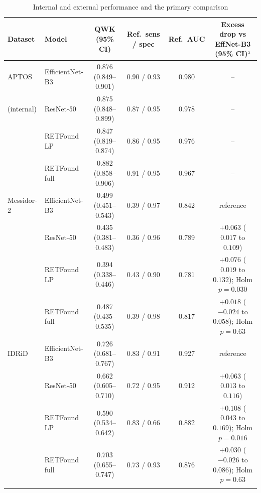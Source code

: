 \documentclass[pdflatex,sn-basic,Numbered]{sn-jnl}
\begin{document}
\begin{table}
\caption{Internal and external performance and the primary comparison}\label{tab:perf}
\footnotesize
\begin{tabular*}{\textheight}{@{\extracolsep\fill}llcccc}
\toprule
Dataset & Model & QWK (95\% CI) & Ref.\ sens / spec & Ref.\ AUC & Excess drop vs EffNet-B3 (95\% CI)$^{\mathrm{a}}$ \\
\midrule
APTOS & EfficientNet-B3 & 0.876 (0.849--0.901) & 0.90 / 0.93 & 0.980 & -- \\
(internal) & ResNet-50 & 0.875 (0.848--0.899) & 0.87 / 0.95 & 0.978 & -- \\
 & RETFound LP & 0.847 (0.819--0.874) & 0.86 / 0.95 & 0.976 & -- \\
 & RETFound full & 0.882 (0.858--0.906) & 0.91 / 0.95 & 0.967 & -- \\
\midrule
Messidor-2 & EfficientNet-B3 & 0.499 (0.451--0.543) & 0.39 / 0.97 & 0.842 & reference \\
 & ResNet-50 & 0.435 (0.381--0.483) & 0.36 / 0.96 & 0.789 & $+0.063$ ($0.017$ to $0.109$) \\
 & RETFound LP & 0.394 (0.338--0.446) & 0.43 / 0.90 & 0.781 & $+0.076$ ($0.019$ to $0.132$); Holm $p=0.030$ \\
 & RETFound full & 0.487 (0.435--0.535) & 0.39 / 0.98 & 0.817 & $+0.018$ ($-0.024$ to $0.058$); Holm $p=0.63$ \\
\midrule
IDRiD & EfficientNet-B3 & 0.726 (0.681--0.767) & 0.83 / 0.91 & 0.927 & reference \\
 & ResNet-50 & 0.662 (0.605--0.710) & 0.72 / 0.95 & 0.912 & $+0.063$ ($0.013$ to $0.116$) \\
 & RETFound LP & 0.590 (0.534--0.642) & 0.83 / 0.66 & 0.882 & $+0.108$ ($0.043$ to $0.169$); Holm $p=0.016$ \\
 & RETFound full & 0.703 (0.655--0.747) & 0.73 / 0.93 & 0.876 & $+0.030$ ($-0.026$ to $0.086$); Holm $p=0.63$ \\
\botrule
\end{tabular*}
\end{table}
\end{document}
